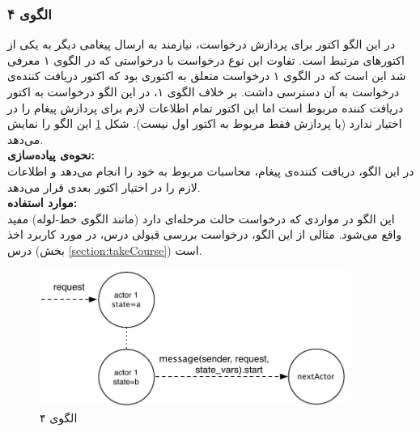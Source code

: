 \subsubsection{الگوی ۴}
در این الگو اکتور برای پردازش درخواست، نیازمند به ارسال پیغامی دیگر به یکی از اکتورهای مرتبط است. تفاوت این نوع درخواست با درخواستی که در الگوی ۱ معرفی شد این است که در الگوی ۱ درخواست متعلق به اکتوری بود که اکتور دریافت کننده‌ی درخواست به آن دسترسی داشت. بر خلاف الگوی ۱، در این الگو درخواست به اکتور دریافت کننده مربوط است اما این اکتور تمام اطلاعات لازم برای پردازش پیغام را در اختیار ندارد (یا پردازش فقط مربوط به اکتور اول نیست). شکل \ref{fig:Patterns_stateless_4} این الگو را نمایش می‌دهد.\\
\textbf{نحوه‌ی پیاده‌سازی:}\\
 در این الگو، دریافت کننده‌ی پیغام، محاسبات مربوط به خود را انجام می‌دهد و اطلاعات لازم را در اختیار اکتور بعدی قرار می‌دهد. \\
 \textbf{موارد استفاده:}\\
این الگو در مواردی که درخواست حالت مرحله‌ای دارد (مانند الگوی خط-لوله) مفید واقع می‌شود. مثالی از این الگو، درخواست بررسی قبولی درس، در مورد کاربرد اخذ درس (بخش \ref{section:takeCourse}) است.
\begin{figure}[hb]
    \begin{center}
	\includegraphics[width=10cm]{4-ProposedFramework/Figures/Patterns_stateless_4.pdf}
    \end{center}
    \caption{\label{fig:Patterns_stateless_4}الگوی ۴}
\end{figure}

